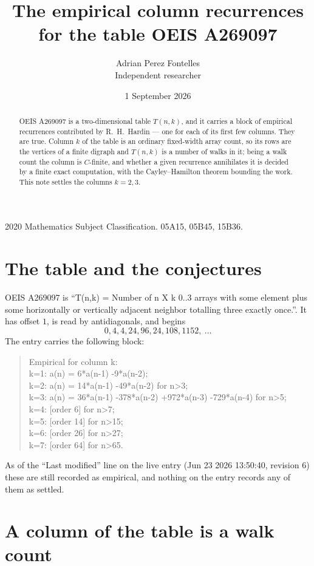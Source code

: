 \documentclass[11pt,a4paper]{article}
\title{The empirical column recurrences for the table OEIS A269097}
\author{Adrian Perez Fontelles\\ \small Independent researcher}
\date{1 September 2026}
\theoremstyle{plain}
\theoremstyle{definition}
\begin{document}
\maketitle

\begin{abstract}
OEIS A269097 is a two-dimensional table $T(n,k)$, and it carries a block of empirical
recurrences contributed by R.~H.~Hardin --- one for each of its first few columns. They are
true. Column $k$ of the table is an ordinary fixed-width array count, so its rows are the
vertices of a finite digraph and $T(n,k)$ is a number of walks in it; being a walk count the
column is $C$-finite, and whether a given recurrence annihilates it is decided by a finite
exact computation, with the Cayley--Hamilton theorem bounding the work. This note settles the columns $k=2, 3$.
\end{abstract}

\noindent\small 2020 Mathematics Subject Classification. 05A15, 05B45, 15B36.\normalsize

\section{The table and the conjectures}

OEIS A269097 is ``T(n,k) = Number of n X k 0..3 arrays with some element plus some horizontally or vertically adjacent neighbor totalling three exactly once.''. It has offset $1$, is
read by antidiagonals, and begins
\[
0, 4, 4, 24, 96, 24, 108, 1152,\ \dots
\]
The entry carries the following block:
\begin{quote}\small
Empirical for column k:\\
k=1: a(n) = 6*a(n-1) -9*a(n-2);\\
k=2: a(n) = 14*a(n-1) -49*a(n-2) for n>3;\\
k=3: a(n) = 36*a(n-1) -378*a(n-2) +972*a(n-3) -729*a(n-4) for n>5;\\
k=4: [order 6] for n>7;\\
k=5: [order 14] for n>15;\\
k=6: [order 26] for n>27;\\
k=7: [order 64] for n>65.\\
\end{quote}
As of the ``Last modified'' line on the live entry (Jun 23 2026 13:50:40, revision 6) these are still
recorded as empirical, and nothing on the entry records any of them as settled.

\section{A column of the table is a walk count}
\end{document}
